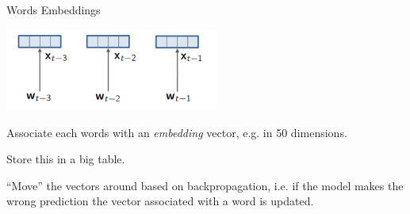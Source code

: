 \documentclass{beamer}
\let\tempone\itemize
\let\temptwo\enditemize
\renewenvironment{itemize}{\tempone\addtolength{\itemsep}{0.5\baselineskip}}{\temptwo}
\newcommand{\boldx}{\mathbf{x}}
\newcommand{\boldb}{\mathbf{b}}
\newcommand{\boldW}{\mathbf{W}}
\begin{document}
\begin{frame}{Words Embeddings}
  \begin{center}
    \includegraphics[width=7cm]{emb}
  \end{center}
  \begin{itemize}
  \item Associate each words with an \textit{embedding} vector, e.g. in 50 dimensions. 
  \item Store this in a big table. 
  \item ``Move'' the vectors around based on backpropagation, i.e. if the model 
    makes the wrong prediction the vector associated with a word is updated.
  \end{itemize}
\end{frame}

  














  
\end{document}
